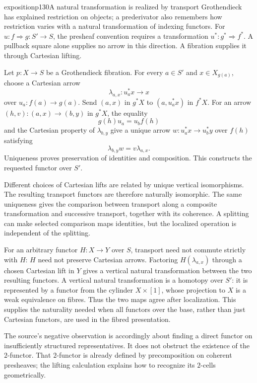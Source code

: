 \begin{dcomment}{exposition}{p130}{A natural transformation is realized by transport}
Grothendieck has explained restriction on objects; a prederivator also remembers how restriction varies with a natural transformation of indexing functors. For $u:f\Rightarrow g:S'\to S$, the presheaf convention requires a transformation $u^*:g^*\Rightarrow f^*$. A pullback square alone supplies no arrow in this direction. A fibration supplies it through Cartesian lifting.

Let $p:X\to S$ be a Grothendieck fibration. For every $a\in S'$ and $x\in X_{g(a)}$, choose a Cartesian arrow
\[
 \lambda_{a,x}:u_a^*x\longrightarrow x
\]
over $u_a:f(a)\to g(a)$. Send $(a,x)$ in $g^*X$ to $(a,u_a^*x)$ in $f^*X$. For an arrow $(h,v):(a,x)\to(b,y)$ in $g^*X$, the equality
\[
 g(h)u_a=u_bf(h)
\]
and the Cartesian property of $\lambda_{b,y}$ give a unique arrow $w:u_a^*x\to u_b^*y$ over $f(h)$ satisfying
\[
 \lambda_{b,y}w=v\lambda_{a,x}.
\]
Uniqueness proves preservation of identities and composition. This constructs the requested functor over $S'$.

Different choices of Cartesian lifts are related by unique vertical isomorphisms. The resulting transport functors are therefore naturally isomorphic. The same uniqueness gives the comparison between transport along a composite transformation and successive transport, together with its coherence. A splitting can make selected comparison maps identities, but the localized operation is independent of the splitting.

For an arbitrary functor $H:X\to Y$ over $S$, transport need not commute strictly with $H$: $H$ need not preserve Cartesian arrows. Factoring $H(\lambda_{a,x})$ through a chosen Cartesian lift in $Y$ gives a vertical natural transformation between the two resulting functors. A vertical natural transformation is a homotopy over $S'$: it is represented by a functor from the cylinder $X\times[1]$, whose projection to $X$ is a weak equivalence on fibres. Thus the two maps agree after localization. This supplies the naturality needed when all functors over the base, rather than just Cartesian functors, are used in the fibred presentation.

The source's negative observation is accordingly about finding a direct functor on insufficiently structured representatives. It does not obstruct the existence of the $2$-functor. That $2$-functor is already defined by precomposition on coherent presheaves; the lifting calculation explains how to recognize its $2$-cells geometrically.
\end{dcomment}


